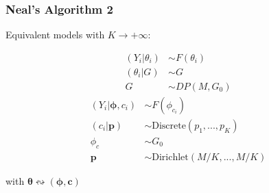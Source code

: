 
\begin{frame} %
	\frametitle{Neal's Algorithm 2}
Equivalent models with $ K\rightarrow +\infty$:
\begin{figure}[htpb] 
        \begin{align*}
            (Y_{i}|\theta_{i})&\sim F(\theta_{i}) \\
            (\theta_{i}|G)&\sim G \\
            G & \sim DP(M,G_{0})
        \end{align*}
\endminipage 
        \begin{align*}
            (Y_{i}|\mathbf{\phi},c_{i})&\sim F(\phi_{c_{i}}) \\
            (c_{i}|\mathit{\mathbf{p}})&\sim \text{Discrete}(\mathit{p_{1}},...,\mathit{p_{K}})\\
            \phi_{c} & \sim G_{0} \\
            \mathbf{p} &\sim \text{Dirichlet}(M/K,...,M/K) 
        \end{align*}
\endminipage  
\end{figure}
\begin{center}
	\vspace{30pt}
	with $\boldsymbol\theta \leftrightsquigarrow (\boldsymbol\phi, \mathbf c)$
\end{center}




\end{frame}




